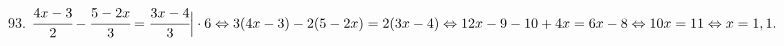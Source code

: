 93. $\cfrac{4x-3}{2}-\cfrac{5-2x}{3}=\cfrac{3x-4}{3}\Big|\cdot6\Leftrightarrow 3(4x-3)-2(5-2x)=2(3x-4)\Leftrightarrow 12x-9-10+4x=6x-8\Leftrightarrow
10x=11\Leftrightarrow x=1,1.$\\
